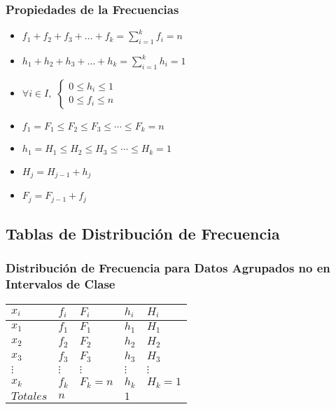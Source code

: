 \subsubsection{Propiedades de la Frecuencias}
\begin{itemize}
\item $f_1+f_2+f_3+\ldots + f_k = \displaystyle\sum_{i=1}^{k} f_i=n$
\item $h_1+h_2+h_3+\ldots + h_k = \displaystyle\sum_{i=1}^{k} h_i=1$
\item $\forall i \in I, $
$\begin{cases} 
0\leq h_i \leq 1\\
0 \leq f_i \leq n
 \end{cases}$
\item $f_1=F_1 \leq F_2 \leq F_3 \leq \cdots \leq F_k=n$
\item $h_1 = H_1 \leq H_2 \leq H_3 \leq \cdots \leq H_k = 1$ 
\item $H_j = H_{j-1}+h_j$
\item $F_j = F_{j-1}+f_j$
\end{itemize}

\subsection{Tablas de Distribución de Frecuencia}
\subsubsection{Distribución de Frecuencia para Datos Agrupados no en Intervalos de Clase}
\begin{center}
\begin{tabular}{|C{1.5cm}|C{1.5cm}|C{1.5cm}|C{1.5cm}|C{1.5cm}|}
\hline
$x_i$ & $f_i$ & $F_i$ & $h_i$ & $H_i$\\ \hline
$x_1$ & $f_1$ & $F_1$ & $h_1$ & $H_1$\\ \hline
$x_2$ & $f_2$ & $F_2$ & $h_2$ & $H_2$\\ \hline
$x_3$ & $f_3$ & $F_3$ & $h_3$ & $H_3$\\ \hline
$\vdots$ & $\vdots$ & $\vdots$ & $\vdots$ & $\vdots$ \\ \hline
$x_k$ & $f_k$ & $F_k=n$ & $h_k$ & $H_k=1$ \\ \hline
$Totales$ & $n$ &  & $1$ & \\ 
\hline
\end{tabular}
\end{center}
